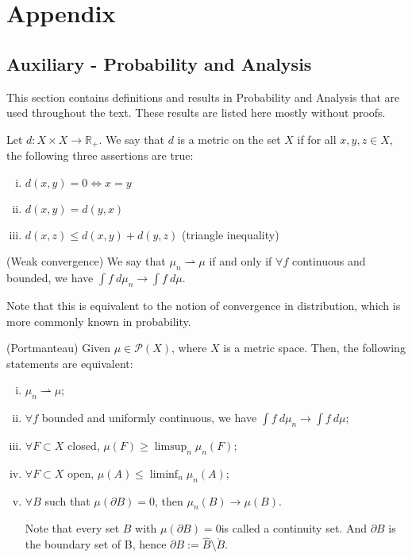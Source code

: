 \newpage
\section{Appendix}

\subsection{Auxiliary - Probability and Analysis}
This section contains definitions and results in Probability and
Analysis that are used throughout the text. These results are listed
here mostly without proofs.

\begin{definition}
	Let $d:X\times X \to \mathbb R_+$. We say that $d$ is a metric on the set $X$ if
	for all $x,y,z \in X$, the following three assertions are true:
	\begin{enumerate}[i)]
		\item $d(x,y) = 0 \iff x = y$
		\item $d(x,y) = d(y,x)$
		\item $d(x,z) \leq d(x,y) + d(y,z)$ (triangle inequality)
	\end{enumerate}
	\label{def:metric}
\end{definition}

\begin{definition}(Weak convergence)
	We say that $\mu_n \rightharpoonup \mu$ if and only if
	$\forall f$ continuous and bounded, we have
	$\int f \ d\mu_n \to \int f \ d\mu$.
	\label{def:weakconv}
\end{definition}
Note that this is equivalent to the notion of convergence in distribution,
which is more commonly known in probability.

\begin{theorem}(Portmanteau)
	\label{Portmanteau}
	Given $\mu \in \mathcal{P}(X)$, where $X$ is a metric space.
	Then, the following statements are equivalent:
	\begin{enumerate}[i)]
		\item $\mu_n \rightharpoonup \mu$;

		\item $\forall f$ bounded and uniformly continuous,
		      we have $\int f \ d\mu_n \to \int f \ d\mu$;

		\item $\forall F \subset X$ closed,
		      $\mu(F) \geq \limsup_n \mu_n(F)$;

		\item $\forall F \subset X$ open,
		      $\mu(A) \leq \liminf_n \mu_n(A)$;

		\item $\forall B$ such that $\mu(\partial B)= 0$, then
		      $\mu_n(B) \to \mu(B)$.

		      Note that every set $B$ with
		      $\mu(\partial B)=0$is called
		      a continuity set. And $\partial B$ is the boundary set of
		      B, hence $\partial B := \hat B \setminus \mathring B$.
	\end{enumerate}

\end{theorem}

